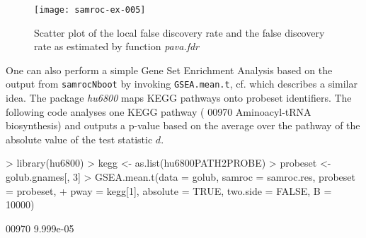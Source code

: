 \documentclass[11pt]{article}
\newcommand{\Rpackage}[1]{\textit{#1}}
\newcommand{\Rfunction}[1]{{\small\texttt{#1}}}
\begin{document}
\begin{figure}[htbp]
\centering
\begin{Schunk}
\end{Schunk}
\texttt{[image: samroc-ex-005]}
\caption{Scatter plot of the local false discovery rate and the false discovery rate as estimated by function \textit{pava.fdr}}
\label{hist2}
\end{figure}

One can also perform a simple Gene Set Enrichment Analysis based on the output from \Rfunction{samrocNboot} by invoking \Rfunction{GSEA.mean.t},
cf. \cite{lutian:2005} which describes a similar idea. The package \Rpackage{hu6800} maps KEGG pathways \cite{kegg:2000} onto probeset identifiers. The following code
analyses one KEGG pathway ( 00970 Aminoacyl-tRNA biosynthesis) and outputs a p-value based on the average over the pathway of 
the absolute value of the test statistic $d$.

\begin{Schunk}
\begin{Sinput}
> library(hu6800)
> kegg <- as.list(hu6800PATH2PROBE)
> probeset <- golub.gnames[, 3]
> GSEA.mean.t(data = golub, samroc = samroc.res, probeset = probeset, 
+     pway = kegg[1], absolute = TRUE, two.side = FALSE, B = 10000)
\end{Sinput}
\begin{Soutput}
    00970 
9.999e-05 
\end{Soutput}
\end{Schunk}


\newpage


\end{document}
